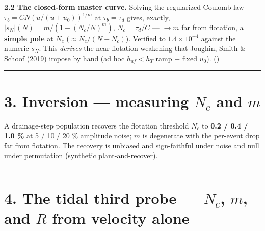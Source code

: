 \documentclass[11pt]{article}
\begin{document}
\textbf{2.2 The closed-form master curve.} Solving the regularized-Coulomb law $\tau _{b}=C N (u/(u+u_{0}))^{1/m}$ at $\tau _{b}=\tau _{d}$ gives, exactly, $|s_{N}|(N)=m/(1-(N_{c}/N)^{m})$, $N_{c}=\tau _{d}/C$ — $\to m$ far from flotation, a \textbf{simple pole} at $N_{c}$ ($\approx N_{c}/(N-N_{c})$). Verified to $1.4\times 10^{-4}$ against the numeric $s_{N}$. This \emph{derives} the near-flotation weakening that Joughin, Smith \& Schoof (2019) impose by hand (ad hoc $h_{af}<h_{T}$ ramp + fixed $u_{0}$). ()


\medskip\hrule\medskip


\section*{3. Inversion — measuring $N_{c}$ and $m$}


A drainage-step population recovers the flotation threshold $N_{c}$ to \textbf{0.2 / 0.4 / 1.0 \%} at 5 / 10 / 20 \% amplitude noise; $m$ is degenerate with the per-event drop far from flotation. The recovery is unbiased and sign-faithful under noise and null under permutation (synthetic plant-and-recover).


\medskip\hrule\medskip


\section*{4. The tidal third probe — $N_{c}$, $m$, and $R$ from velocity alone}
\end{document}
